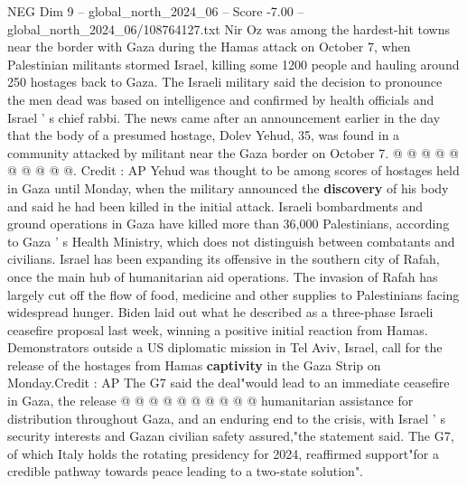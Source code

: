 \begin{textsample}{NEG Dim 9 – global\_north\_2024\_06 – Score -7.00 – global\_north\_2024\_06/108764127.txt}
Nir Oz was among the hardest-hit towns near the border with Gaza during the Hamas attack on October 7, when Palestinian militants stormed Israel, killing some 1200 people and hauling around 250 hostages back to Gaza.
The Israeli military said the decision to pronounce the men dead was based on intelligence and confirmed by health officials and Israel ' s chief rabbi.
The news came after an announcement earlier in the day that the body of a presumed hostage, Dolev Yehud, 35, was found in a community attacked by militant near the Gaza border on October 7. @ @ @ @ @ @ @ @ @ @.
Credit : AP Yehud was thought to be among scores of hostages held in Gaza until Monday, when the military announced the \textbf{discovery} of his body and said he had been killed in the initial attack.
Israeli bombardments and ground operations in Gaza have killed more than 36,000 Palestinians, according to Gaza ' s Health Ministry, which does not distinguish between combatants and civilians.
Israel has been expanding its offensive in the southern city of Rafah, once the main hub of humanitarian aid operations.
The invasion of Rafah has largely cut off the flow of food, medicine and other supplies to Palestinians facing widespread hunger.
Biden laid out what he described as a three-phase Israeli ceasefire proposal last week, winning a positive initial reaction from Hamas.
Demonstrators outside a US diplomatic mission in Tel Aviv, Israel, call for the release of the hostages from Hamas \textbf{captivity} in the Gaza Strip on Monday.Credit : AP The G7 said the deal"would lead to an immediate ceasefire in Gaza, the release @ @ @ @ @ @ @ @ @ @ humanitarian assistance for distribution throughout Gaza, and an enduring end to the crisis, with Israel ' s security interests and Gazan civilian safety assured,"the statement said.
The G7, of which Italy holds the rotating presidency for 2024, reaffirmed support"for a credible pathway towards peace leading to a two-state solution".

\end{textsample}
